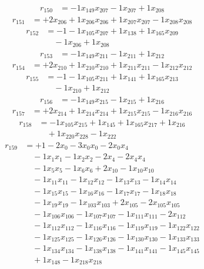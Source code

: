 \[\begin{aligned}
r_{150} &= - 1 x_{149} x_{207} - 1 x_{207} + 1 x_{208}
\end{aligned}\]
\[\begin{aligned}
r_{151} &= + 2 x_{206} + 1 x_{206} x_{206} + 1 x_{207} x_{207} - 1 x_{208} x_{208}
\end{aligned}\]
\[\begin{aligned}
r_{152} &= - 1 - 1 x_{105} x_{207} + 1 x_{138} + 1 x_{165} x_{209} \\
 &\quad - 1 x_{206} + 1 x_{208}
\end{aligned}\]
\[\begin{aligned}
r_{153} &= - 1 x_{149} x_{211} - 1 x_{211} + 1 x_{212}
\end{aligned}\]
\[\begin{aligned}
r_{154} &= + 2 x_{210} + 1 x_{210} x_{210} + 1 x_{211} x_{211} - 1 x_{212} x_{212}
\end{aligned}\]
\[\begin{aligned}
r_{155} &= - 1 - 1 x_{105} x_{211} + 1 x_{141} + 1 x_{165} x_{213} \\
 &\quad - 1 x_{210} + 1 x_{212}
\end{aligned}\]
\[\begin{aligned}
r_{156} &= - 1 x_{149} x_{215} - 1 x_{215} + 1 x_{216}
\end{aligned}\]
\[\begin{aligned}
r_{157} &= + 2 x_{214} + 1 x_{214} x_{214} + 1 x_{215} x_{215} - 1 x_{216} x_{216}
\end{aligned}\]
\[\begin{aligned}
r_{158} &= - 1 x_{105} x_{215} + 1 x_{145} + 1 x_{165} x_{217} + 1 x_{216} \\
 &\quad + 1 x_{220} x_{228} - 1 x_{222}
\end{aligned}\]
\[\begin{aligned}
r_{159} &= + 1 - 2 x_{0} - 3 x_{0} x_{0} - 2 x_{0} x_{4} \\
 &\quad - 1 x_{1} x_{1} - 1 x_{2} x_{2} - 2 x_{4} - 2 x_{4} x_{4} \\
 &\quad - 1 x_{5} x_{5} - 1 x_{6} x_{6} + 2 x_{10} - 1 x_{10} x_{10} \\
 &\quad - 1 x_{11} x_{11} - 1 x_{12} x_{12} - 1 x_{13} x_{13} - 1 x_{14} x_{14} \\
 &\quad - 1 x_{15} x_{15} - 1 x_{16} x_{16} - 1 x_{17} x_{17} - 1 x_{18} x_{18} \\
 &\quad - 1 x_{19} x_{19} - 1 x_{103} x_{103} + 2 x_{105} - 2 x_{105} x_{105} \\
 &\quad - 1 x_{106} x_{106} - 1 x_{107} x_{107} - 1 x_{111} x_{111} - 2 x_{112} \\
 &\quad - 1 x_{112} x_{112} - 1 x_{116} x_{116} - 1 x_{119} x_{119} - 1 x_{122} x_{122} \\
 &\quad - 1 x_{125} x_{125} - 1 x_{126} x_{126} - 1 x_{130} x_{130} - 1 x_{133} x_{133} \\
 &\quad - 1 x_{134} x_{134} - 1 x_{138} x_{138} - 1 x_{141} x_{141} - 1 x_{145} x_{145} \\
 &\quad + 1 x_{148} - 1 x_{218} x_{218}
\end{aligned}\]
